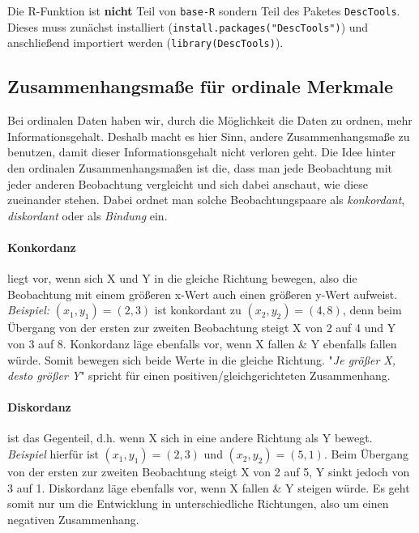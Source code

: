 \documentclass[a4paper]{article}
\newcommand\dangersign[1][2ex]{%
  \renewcommand\stacktype{L}%
  \scaleto{\stackon[1.3pt]{\color{red}$\triangle$}{\tiny !}}{#1}%
}
\begin{document}
\noindent  {}

\noindent \dangersign[3ex] Die R-Funktion ist \textbf{nicht} Teil von \texttt{base-R} sondern Teil des Paketes \texttt{DescTools}. Dieses muss zunächst installiert (\texttt{install.packages("DescTools")}) und anschließend importiert werden (\texttt{library(DescTools)}).

\clearpage

\subsection{Zusammenhangsmaße für ordinale Merkmale}\label{sec:zshg-ord}
Bei ordinalen Daten haben wir, durch die Möglichkeit die Daten zu ordnen, mehr Informationsgehalt. Deshalb macht es hier Sinn, andere Zusammenhangsmaße zu benutzen, damit dieser Informationsgehalt nicht verloren geht. Die Idee hinter den ordinalen Zusammenhangsmaßen ist die, dass man jede Beobachtung mit jeder anderen Beobachtung vergleicht und sich dabei anschaut, wie diese zueinander stehen. Dabei ordnet man solche Beobachtungspaare als \textit{konkordant}, \textit{diskordant} oder als \textit{Bindung} ein.

\paragraph{Konkordanz} liegt vor, wenn sich X und Y in die gleiche Richtung bewegen, also die Beobachtung mit einem größeren x-Wert auch einen größeren y-Wert aufweist.\\
\textit{Beispiel:} $(x_1,y_1)=(2,3)$ ist konkordant zu $(x_2,y_2)=(4,8)$, denn beim Übergang von der ersten zur zweiten Beobachtung steigt X von 2 auf 4 und Y von 3 auf 8. Konkordanz läge ebenfalls vor, wenn X fallen \& Y ebenfalls fallen würde. Somit bewegen sich beide Werte in die gleiche Richtung. "\textit{Je größer X, desto größer Y}" spricht für einen positiven/gleichgerichteten Zusammenhang.

\paragraph{Diskordanz} ist das Gegenteil, d.h. wenn X sich in eine andere Richtung als Y bewegt.\\
\textit{Beispiel} hierfür ist $(x_1,y_1)=(2,3)$ und $(x_2,y_2)=(5,1)$. Beim Übergang von der ersten zur zweiten Beobachtung steigt X von 2 auf 5, Y sinkt jedoch von 3 auf 1. Diskordanz läge ebenfalls vor, wenn X fallen \& Y steigen würde. Es geht somit nur um die Entwicklung in unterschiedliche Richtungen, also um einen negativen Zusammenhang.
\end{document}
